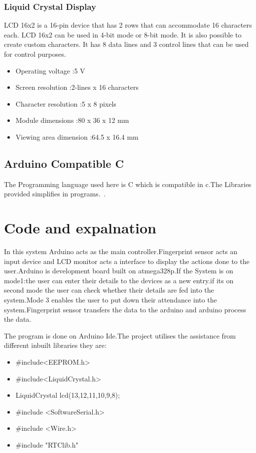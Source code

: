 \documentclass[40pt]{report}
\begin{document}
\begin{itemize}
\subsection{Liquid Crystal Display}
LCD 16x2 is a 16-pin device that has 2 rows that can accommodate 16 characters each. LCD 16x2 can be used in 4-bit mode or 8-bit mode. It is also possible to create custom characters. It has 8 data lines and 3 control lines that can be used for control purposes.
\usepackage{itemize}
 \begin{itemize}
\item Operating voltage	:5 V
\item Screen resolution	:2-lines x 16 characters
\item Character resolution	:5 x 8 pixels
\item Module dimensions	:80 x 36 x 12 mm
\item Viewing area dimension  :64.5 x 16.4 mm
\end{itemize}

 

 

\section{Arduino Compatible C}
\label{Arduino compatible C}
 The Programming language used here is C which is compatible in c.The Libraries provided simplifies in programs.~\cite{w_knuthwebsite}.


\chapter{Code and expalnation}
\label{ch_SysDesc}
In this system Arduino acts as the main controller.Fingerprint sensor acts an input device and LCD monitor acts a interface to display the actions done to the user.Arduino is development board built on atmega328p.If the System is on mode1:the user can enter their details to the devices as a new entry.if its on second mode the user can check whether their details are fed into the system.Mode 3 enables the user to put down their attendance into the system.Fingerprint sensor transfers the data to the arduino and arduino process the data.

The program is done on Arduino Ide.The project utilises the assistance from different inbuilt libraries they are:
\usepackage{itemize}
 \begin{itemize}
\item #include<EEPROM.h> 
\item #include<LiquidCrystal.h>
\item LiquidCrystal lcd(13,12,11,10,9,8);
\item #include <SoftwareSerial.h>
\item #include <Wire.h>
\item #include "RTClib.h"
 

\end{itemize}
\end{itemize}
\end{document}
